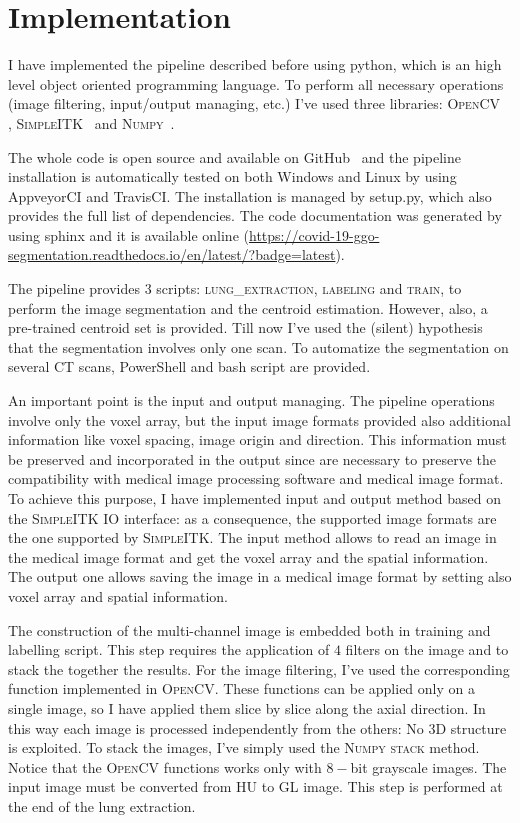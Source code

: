 
	
	\section{Implementation}
	
	
	I have implemented the pipeline described before using python, which is an high level object oriented programming language. To perform all necessary operations (image filtering, input/output managing, etc.) I've used three libraries: \textsc{OpenCV}~\cite{OpenCV} , \textsc{SimpleITK}~\cite{SimpleITK} and \textsc{Numpy}~\cite{Numpy}.

	The whole code is open source and available on GitHub~\cite{REP:CTLungSeg} and the pipeline installation is automatically tested on both Windows and Linux by using AppveyorCI and TravisCI. The installation is managed by setup.py, which also provides the full list of dependencies. The code documentation was generated by using sphinx and it is available online (\url{https://covid-19-ggo-segmentation.readthedocs.io/en/latest/?badge=latest}). 

	The pipeline provides $3$ scripts: \textsc{lung\_extraction}, \textsc{labeling} and \textsc{train}, to perform the image segmentation and the centroid estimation. However, also, a pre-trained centroid set is provided. Till now I've used the (silent) hypothesis that the segmentation involves only one scan. To automatize the segmentation on several CT scans, PowerShell and bash script are provided.

	An important point is the input and output managing. The pipeline operations involve only the voxel array, but the input image formats provided also additional information like voxel spacing, image origin and direction. This information must be preserved and incorporated in the output since are necessary to preserve the compatibility with medical image processing software and medical image format. 
	To achieve this purpose, I have implemented input and output method based on the \textsc{SimpleITK} IO interface: as a consequence, the supported image formats are the one supported by \textsc{SimpleITK}. The input method allows to read an image in the medical image format and get the voxel array and the spatial information. The output one allows saving the image in a medical image format by setting also voxel array and spatial information.

	The construction of the multi-channel image is embedded both in training and labelling script. This step requires the application of $4$ filters on the image and to stack the together the results. For the image filtering, I've used the corresponding function implemented in \textsc{OpenCV}. These functions can be applied only on a single image, so I have applied them slice by slice along the axial direction. In this way each image is processed independently from the others: No 3D structure is exploited. To stack the images, I've simply used the \textsc{Numpy} \textsc{stack} method.
	Notice that the \textsc{OpenCV} functions works only with $8-$bit grayscale images. The input image must be converted from HU to GL image. This step is performed at the end of the lung extraction.




	
	

 
